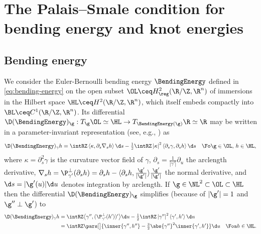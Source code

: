 \section{The Palais--Smale condition for bending energy and knot energies}
\label{sec:PS-bending+knot-energies}

\subsection{Bending energy}
\label{sec:PS-bending}
We consider the Euler-Bernoulli bending energy $\BendingEnergy$ defined in
\cref{eq:bending-energy}
on the open subset
$\OL \ceq H^2_\reg(\R/\Z,\R^n)$ of immersions in the Hilbert space 
$\HL \ceq H^2(\R/\Z,\R^n)$, which itself embeds compactly into 
$\BL\ceq C^1(\R/\Z,\R^n)$. Its differential 
$\D(\BendingEnergy)_\g:
T_\g \OL\simeq\HL\to T_{\BendingEnergy(\g)}\R\simeq\R $
may be written in a parameter-invariant representation (see, e.g., 
\cite[Proof of Lemma A.1]{dallacqua-pozzi_2014})
as
\begin{align*}
        \D(\BendingEnergy)_{\gamma}h\textstyle
= \intRZ\left\langle \kappa,\partial_s\nabla_s h \right\rangle \d s 
- \frac{1}{2} \intRZ \left|\kappa \right|^2 \left\langle \partial_s 
\gamma,\partial_s h \right\rangle \d s\quad\Fo \g\in\OL,\,h\in\HL,
\end{align*}
where $ \kappa=\partial^2_s \gamma $ is the curvature vector field of 
$ \gamma $,
 $ \partial_s =\frac{1}{|\gamma'|}\partial_u $ the 
 arclength derivative, $ \nabla_s h = \P^{\perp}_{\gamma'}(\partial_s h)=
 \partial_s  h-\langle\partial_s h,\frac{\g'}{|\g'|}\rangle
 \frac{\g'}{|\g'|}$
 the normal derivative,
 and $\d s=|\g'(u)|\d u$ denotes
integration by arclength. 
If $\g\in \NL^{2}\subset\OL\subset\HL$ 
then the differential
$\D(\BendingEnergy)_\g$ 
simplifies (because of $|\g'|=1$ and $\g''\perp \g'$) to
\begin{align}
\D(\BendingEnergy)_{\gamma}h&\textstyle
= \intRZ \big\langle \gamma'',( \P_{\gamma'}^\perp(h') )' 
\big\rangle \d u 
-\frac{1}{2} \intRZ\left|\gamma'' \right|^2 
\left\langle \gamma',h' \right\rangle \d u\notag\\
                &
		\textstyle
		=\intRZ 
        \pars[\big]{
            \inner{ \gamma'',h'' } 
            - 
            \frac{3}{2}\abs{\gamma'' }^2
            \inner{ \gamma',h' }
        }
        \d u
		\quad\Foa h\in\HL.
        \label{eq:Diff_elastic_formula}
\end{align}

